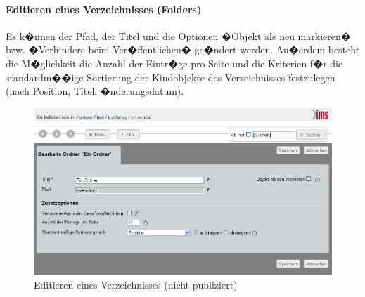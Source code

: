 %
%
%
%

\paragraph{Editieren eines Verzeichnisses (Folders)}

Es k�nnen 
der Pfad,
 der Titel und die Optionen �Objekt als neu
markieren� bzw. �Verhindere  beim Ver�ffentlichen� ge�ndert
werden. Au�erdem besteht die M�glichkeit die Anzahl der Eintr�ge pro Seite und die Kriterien f�r die standardm��ige
Sortierung der Kindobjekte des Verzeichnisses festzulegen (nach Position, Titel,
�nderungsdatum).

\begin{figure}[!ht]
  \centering
  \includegraphics[width=\textwidth]{./images/edit-folder.png}
  \caption{Editieren eines Verzeichnisses (nicht publiziert)}
  \label{fig:editierefolder}
\end{figure}

